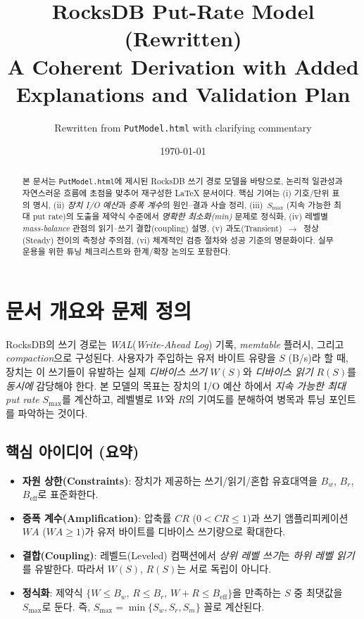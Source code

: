 \documentclass[11pt,a4paper]{article}
\title{\textbf{RocksDB Put-Rate Model (Rewritten)\\
\large A Coherent Derivation with Added Explanations and Validation Plan}}
\author{Rewritten from \texttt{PutModel.html} with clarifying commentary}
\date{\today}
\begin{document}
\maketitle

\begin{abstract}
본 문서는 \texttt{PutModel.html}에 제시된 RocksDB 쓰기 경로 모델을 바탕으로,
논리적 일관성과 자연스러운 흐름에 초점을 맞추어 재구성한 LaTeX 문서이다.
핵심 기여는 (i) 기호/단위 표의 명시, (ii) \emph{장치 I/O 예산}과 \emph{증폭 계수}의
원인--결과 사슬 정리, (iii) \(\,S_{\max}\) (지속 가능한 최대 put rate)의 도출을
제약식 수준에서 \emph{명확한 최소화(min)} 문제로 정식화, (iv) 레벨별 \emph{mass-balance}
관점의 읽기--쓰기 결합(coupling) 설명, (v) 과도(Transient)~\(\rightarrow\)~정상(Steady) 전이의
측정상 주의점, (vi) 체계적인 검증 절차와 성공 기준의 명문화이다.
실무 운용을 위한 튜닝 체크리스트와 한계/확장 논의도 포함한다.
\end{abstract}

\section{문서 개요와 문제 정의}
RocksDB의 쓰기 경로는 \emph{WAL}(\textit{Write-Ahead Log}) 기록, \emph{memtable} 플러시,
그리고 \emph{compaction}으로 구성된다.
사용자가 주입하는 유저 바이트 유량을 \(S\) (\si{B/s})라 할 때,
장치는 이 쓰기들이 유발하는 실제 \emph{디바이스 쓰기} \(W(S)\)와
\emph{디바이스 읽기} \(R(S)\)를 \emph{동시에} 감당해야 한다.
본 모델의 목표는 장치의 I/O 예산 하에서 \emph{지속 가능한 최대 put rate} \(S_{\max}\)를 계산하고,
레벨별로 \(W\)와 \(R\)의 기여도를 분해하여 병목과 튜닝 포인트를 파악하는 것이다.

\subsection{핵심 아이디어 (요약)}
\begin{itemize}
  \item \textbf{자원 상한(Constraints)}: 장치가 제공하는 쓰기/읽기/혼합 유효대역을
  \(B_w\), \(B_r\), \(B_{\text{eff}}\)로 표준화한다.
  \item \textbf{증폭 계수(Amplification)}: 압축률 \(CR\) (\(0{<}CR{\le}1\))과
  쓰기 앰플리피케이션 \(WA\) (\(WA{\ge}1\))가 유저 바이트를 디바이스 쓰기량으로 확대한다.
  \item \textbf{결합(Coupling)}: 레벨드(Leveled) 컴팩션에서 \emph{상위 레벨 쓰기}는
  \emph{하위 레벨 읽기}를 유발한다. 따라서 \(W(S)\), \(R(S)\)는 서로 독립이 아니다.
  \item \textbf{정식화}: 제약식 \(\{W\le B_w,\,R\le B_r,\,W{+}R\le B_{\text{eff}}\}\)을 만족하는
  \(S\) 중 최댓값을 \(S_{\max}\)로 둔다. 즉,
  \(\displaystyle S_{\max}=\min\{S_w,S_r,S_m\}\) 꼴로 계산된다.
\end{itemize}
\end{document}
